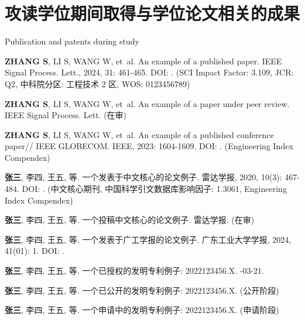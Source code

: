 \chapter{攻读学位期间取得与学位论文相关的成果}{Publication and patents during study}


\begin{results}
  \item 
  \textbf{ZHANG S}, LI S, WANG W, et~al.
  \newblock An example of a published paper\allowbreak[J/OL].
  \newblock IEEE Signal Process. Lett., 2024, 31: 461-465.
  \newblock DOI: .
  \newblock (SCI Impact Factor: 3.109, JCR: Q2, 中科院分区: 工程技术 2 区, WOS: 0123456789)
  \item 
  \textbf{ZHANG S}, LI S, WANG W, et~al.
  \newblock An example of a paper under peer review\allowbreak[J].
  \newblock IEEE Signal Process. Lett.
  \newblock (在审)
  \item 
  \textbf{ZHANG S}, LI S, WANG W, et~al.
  \newblock An example of a published conference paper\allowbreak[C/OL]//\allowbreak
  IEEE GLOBECOM.
  \newblock IEEE, 2023: 1604-1609.
  \newblock DOI: .
  \newblock (Engineering Index Compendex)
  \item 
  \textbf{张三}, 李四, 王五, 等.
  \newblock 一个发表于中文核心的论文例子\allowbreak[J/OL].
  \newblock 雷达学报, 2020, 10\allowbreak (3): 467-484.
  \newblock DOI: .
  \newblock (中文核心期刊, 中国科学引文数据库影响因子: 1.3061, Engineering Index Compendex)
  \item 
  \textbf{张三}, 李四, 王五, 等.
  \newblock 一个投稿中文核心的论文例子\allowbreak[J].
  \newblock 雷达学报.
  \newblock (在审)
  \item 
  \textbf{张三}, 李四, 王五, 等.
  \newblock 一个发表于广工学报的论文例子\allowbreak[J/OL].
  \newblock 广东工业大学学报, 2024, 41\allowbreak (01): 1.
  \newblock DOI: .
\end{results}


\begin{results}
  \item 
  \textbf{张三}, 李四, 王五, 等.
  \newblock 一个已授权的发明专利例子: 2022123456.X\allowbreak[P].
  -03-21.
  \item 
  \textbf{张三}, 李四, 王五, 等.
  \newblock 一个已公开的发明专利例子: 2022123456.X\allowbreak[P].
  \newblock (公开阶段)
  \item 
  \textbf{张三}, 李四, 王五, 等.
  \newblock 一个申请中的发明专利例子: 2022123456.X\allowbreak[P].
  \newblock (申请阶段)
\end{results}